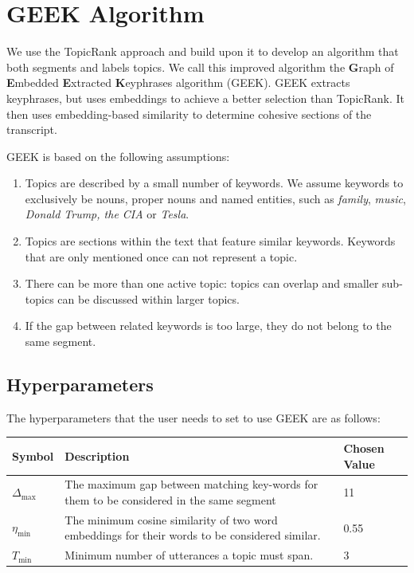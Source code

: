 \section{GEEK Algorithm}

We use the TopicRank approach and build upon it to develop an algorithm that both segments and labels topics. We call this improved algorithm the \textbf{G}raph of \textbf{E}mbedded \textbf{E}xtracted \textbf{K}eyphrases algorithm (GEEK). GEEK extracts keyphrases, but uses embeddings to achieve a better selection than TopicRank. It then uses embedding-based similarity to determine cohesive sections of the transcript.

GEEK is based on the following assumptions:

\begin{enumerate}
    \item Topics are described by a small number of keywords. We assume keywords to exclusively be nouns, proper nouns and named entities, such as \textit{family}, \textit{music}, \textit{Donald Trump, the CIA} or \textit{Tesla}.
    \item Topics are sections within the text that feature similar keywords. Keywords that are only mentioned once can not represent a topic.
    \item There can be more than one active topic: topics can overlap and smaller sub-topics can be discussed within larger topics.
    \item If the gap between related keywords is too large, they do not belong to the same segment.
\end{enumerate}

    \subsection{Hyperparameters}
    The hyperparameters that the user needs to set to use GEEK are as follows:
    
    \begin{table}[h]
        \centering
        \begin{tabularx}{0.9\textwidth}{| t | b | t |}
        \hline
        \textbf{Symbol} & \textbf{Description} & \textbf{Chosen Value} \\ \hline
        $\Delta_{\text{max}}$     & The maximum gap between matching key-words for them to be considered in the same segment & 11                    \\ \hline
        $\eta_{\text{min}}$     & The minimum cosine similarity of two word embeddings for their words to be considered similar. & 0.55                        \\ \hline
        $T_{\text{min}}$ & Minimum number of utterances a topic must span. & 3 \\ \hline
        
        \end{tabularx}
    \end{table}

